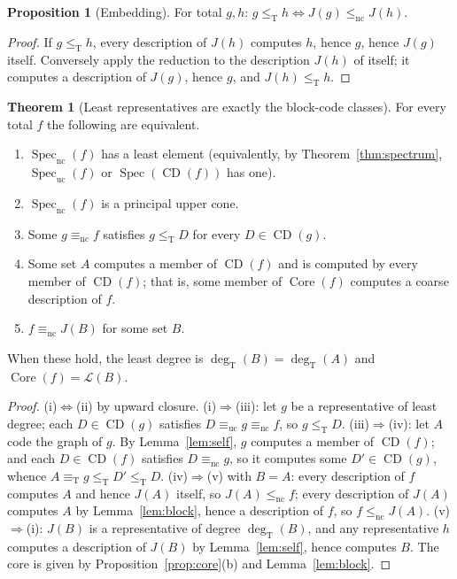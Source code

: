 \documentclass[11pt,letterpaper]{article}
\theoremstyle{definition}
\newtheorem{theorem}[definition]{Theorem}
\newtheorem{proposition}[definition]{Proposition}
\numberwithin{equation}{section}
\newcommand{\leT}{\le_{\mathrm T}}
\newcommand{\eqT}{\equiv_{\mathrm T}}
\newcommand{\lenc}{\le_{\mathrm{nc}}}
\newcommand{\eqnc}{\equiv_{\mathrm{nc}}}
\newcommand{\equc}{\equiv_{\mathrm{uc}}}
\newcommand{\nc}{\mathrm{nc}}
\newcommand{\uc}{\mathrm{uc}}
\newcommand{\CD}{\operatorname{CD}}
\newcommand{\Low}{\mathcal L}
\newcommand{\Core}{\operatorname{Core}}
\newcommand{\Spec}{\operatorname{Spec}}
\newcommand{\degT}{\deg_{\mathrm T}}
\newcommand{\J}{J}
\newcommand{\src}[1]{\leavevmode{\sffamily\footnotesize\color{Steel}[#1]}}
\begin{document}
\begin{proposition}[Embedding]\label{prop:embedding}\src{R2, R5, R8, R9}
For total $g,h$: $g\leT h\iff\J(g)\lenc\J(h)$.
\end{proposition}
\begin{proof}
If $g\leT h$, every description of $\J(h)$ computes $h$, hence $g$, hence $\J(g)$ itself. Conversely apply the reduction to the description $\J(h)$ of itself; it computes a description of $\J(g)$, hence $g$, and $\J(h)\leT h$.
\end{proof}

\begin{theorem}[Least representatives are exactly the block-code classes]\label{thm:least}\src{R1, R2, R5, R6, R7, R8, R9; condition (iv) R1, R4}
For every total $f$ the following are equivalent.
\begin{enumerate}[label=\textup{(\roman*)}]
\item $\Spec_{\nc}(f)$ has a least element (equivalently, by Theorem~\ref{thm:spectrum}, $\Spec_{\uc}(f)$ or $\Spec(\CD(f))$ has one).
\item $\Spec_{\nc}(f)$ is a principal upper cone.
\item Some $g\eqnc f$ satisfies $g\leT D$ for every $D\in\CD(g)$.
\item Some set $A$ computes a member of $\CD(f)$ and is computed by every member of $\CD(f)$; that is, some member of $\Core(f)$ computes a coarse description of $f$.
\item $f\eqnc\J(B)$ for some set $B$.
\end{enumerate}
When these hold, the least degree is $\degT(B)=\degT(A)$ and $\Core(f)=\Low(B)$.
\end{theorem}
\begin{proof}
(i)$\Leftrightarrow$(ii) by upward closure. (i)$\Rightarrow$(iii): let $g$ be a representative of least degree; each $D\in\CD(g)$ satisfies $D\equc g\eqnc f$, so $g\leT D$. (iii)$\Rightarrow$(iv): let $A$ code the graph of $g$. By Lemma~\ref{lem:self}, $g$ computes a member of $\CD(f)$; and each $D\in\CD(f)$ satisfies $D\eqnc g$, so it computes some $D'\in\CD(g)$, whence $A\eqT g\leT D'\leT D$. (iv)$\Rightarrow$(v) with $B=A$: every description of $f$ computes $A$ and hence $\J(A)$ itself, so $\J(A)\lenc f$; every description of $\J(A)$ computes $A$ by Lemma~\ref{lem:block}, hence a description of $f$, so $f\lenc\J(A)$. (v)$\Rightarrow$(i): $\J(B)$ is a representative of degree $\degT(B)$, and any representative $h$ computes a description of $\J(B)$ by Lemma~\ref{lem:self}, hence computes $B$. The core is given by Proposition~\ref{prop:core}(b) and Lemma~\ref{lem:block}.
\end{proof}
\end{document}

